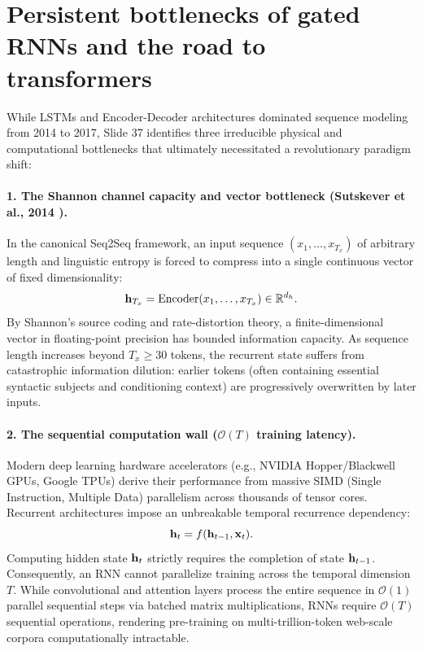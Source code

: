 \documentclass[../../main.tex]{subfiles}
\begin{document}
\section{Persistent bottlenecks of gated RNNs and the road to transformers}
\label{sec:rnn_bottlenecks}

While LSTMs and Encoder-Decoder architectures dominated sequence modeling from 2014 to 2017, Slide 37 identifies three irreducible physical and computational bottlenecks that ultimately necessitated a revolutionary paradigm shift:

\paragraph{1. The Shannon channel capacity and vector bottleneck (Sutskever et al., 2014 \cite{sutskever2014}).}
In the canonical Seq2Seq framework, an input sequence $(x_1, \dots, x_{T_x})$ of arbitrary length and linguistic entropy is forced to compress into a single continuous vector of fixed dimensionality:
\begin{equation}
\mathbf{h}_{T_x} = \operatorname{Encoder}(x_1, \dots, x_{T_x}) \in \mathbb{R}^{d_h}.
\end{equation}
By Shannon's source coding and rate-distortion theory, a finite-dimensional vector in floating-point precision has bounded information capacity. As sequence length increases beyond $T_x \ge 30$ tokens, the recurrent state suffers from catastrophic information dilution: earlier tokens (often containing essential syntactic subjects and conditioning context) are progressively overwritten by later inputs.

\paragraph{2. The sequential computation wall ($\mathcal{O}(T)$ training latency).}
Modern deep learning hardware accelerators (e.g., NVIDIA Hopper/Blackwell GPUs, Google TPUs) derive their performance from massive SIMD (Single Instruction, Multiple Data) parallelism across thousands of tensor cores. Recurrent architectures impose an unbreakable temporal recurrence dependency:
\begin{equation}
\mathbf{h}_t = f(\mathbf{h}_{t-1}, \mathbf{x}_t).
\end{equation}
Computing hidden state $\mathbf{h}_t$ strictly requires the completion of state $\mathbf{h}_{t-1}$. Consequently, an RNN cannot parallelize training across the temporal dimension $T$. While convolutional and attention layers process the entire sequence in $\mathcal{O}(1)$ parallel sequential steps via batched matrix multiplications, RNNs require $\mathcal{O}(T)$ sequential operations, rendering pre-training on multi-trillion-token web-scale corpora computationally intractable.
\end{document}

